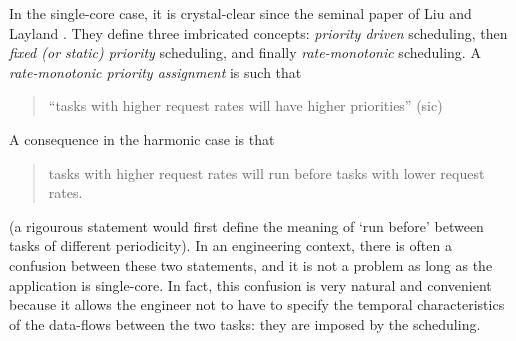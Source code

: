 \documentclass[a4paper]{article}
\begin{document}
In the single-core case, it is crystal-clear since the seminal paper of Liu and Layland \cite{DBLP:journals/jacm/LiuL73}.
They define three imbricated concepts:
\emph{priority driven} scheduling, then \emph{fixed (or static) priority} scheduling, and finally \emph{rate-monotonic} scheduling.
A \emph{rate-monotonic priority assignment} is such that
\begin{quote}
``tasks with higher request rates will have higher priorities'' (sic)
\end{quote}
A consequence in the harmonic case is that
\begin{quote}
tasks with higher request rates will run before tasks with lower request rates.
\end{quote}
(a rigourous statement would first define the meaning of `run before' between tasks of different periodicity).
In an engineering context, there is often a confusion between these two statements,
and it is not a problem as long as the application is single-core.
In fact, this confusion is very natural and convenient because it allows the engineer not to have to specify
the temporal characteristics of the data-flows between the two tasks: they are imposed by the scheduling.
\end{document}
